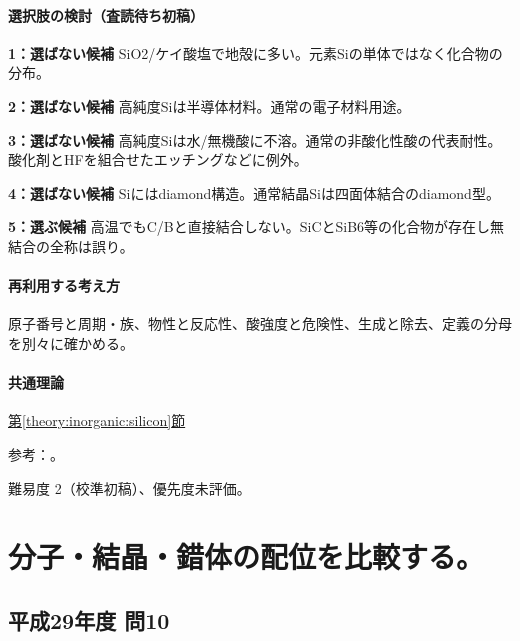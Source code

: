 \paragraph{選択肢の検討（査読待ち初稿）}\mbox{}\par

\noindent\textbf{1：選ばない候補} SiO2/ケイ酸塩で地殻に多い。元素Siの単体ではなく化合物の分布。\par

\noindent\textbf{2：選ばない候補} 高純度Siは半導体材料。通常の電子材料用途。\par

\noindent\textbf{3：選ばない候補} 高純度Siは水/無機酸に不溶。通常の非酸化性酸の代表耐性。酸化剤とHFを組合せたエッチングなどに例外。\par

\noindent\textbf{4：選ばない候補} Siにはdiamond構造。通常結晶Siは四面体結合のdiamond型。\par

\noindent\textbf{5：選ぶ候補} 高温でもC/Bと直接結合しない。SiCとSiB6等の化合物が存在し無結合の全称は誤り。\par

\paragraph{再利用する考え方} 原子番号と周期・族、物性と反応性、酸強度と危険性、生成と除去、定義の分母を別々に確かめる。

\paragraph{共通理論} \hyperref[theory:inorganic:silicon]{第\ref*{theory:inorganic:silicon}節}

\par 参考：\cite{inorganic_metalloid_ref,inorganic_sic,inorganic_sib6,inorganic_hf_etch}。

\par 難易度 2（校準初稿）、優先度未評価。

\section{分子・結晶・錯体の配位を比較する。}

\subsection{平成29年度 問10}
\label{q:h29-reg-applied-10}


